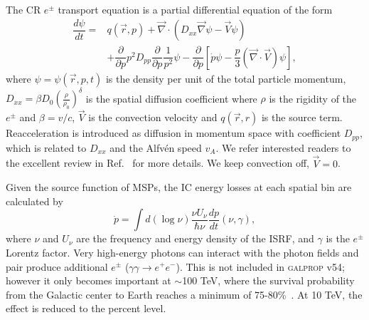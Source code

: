 \documentclass[doublespace,nopageskip]{VTthesis} %
\begin{document}
The CR $e^\pm$ transport equation is a partial differential equation of the form
\begin{align}
  \label{eq:prop_eq}
  \dfrac{d\psi}{dt} = &q(\vec{r},p)+\vec{\nabla}\cdot(D_{xx}\vec{\nabla}\psi-\vec{V}\psi)\nonumber\\
                       &+\dfrac{\partial}{\partial p}p^2D_{pp}\dfrac{\partial}{\partial p}\dfrac{1}{p^2}\psi-\dfrac{\partial}{\partial p}[\dot{p}\psi-\dfrac{p}{3}(\vec{\nabla}\cdot\vec{V})\psi],
\end{align}
where $\psi = \psi(\vec{r},p,t)$ is the density per unit of the total particle momentum, $D_{xx} = \beta D_0 (\frac{\rho}{\rho_0})^\delta$ is the spatial diffusion coefficient where $\rho$ is the rigidity of the $e^\pm$ and $\beta = v/c$, $\vec{V}$ is the convection velocity and $q(\vec{r},r)$ is the source term. Reacceleration is introduced as diffusion in momentum space with coefficient $D_{pp}$, which is related to $D_{xx}$ and the Alfv\'{e}n speed $v_A$. We refer interested readers to the excellent review in Ref.~\cite{Strong:2007nh} for more details. We keep convection off, $\vec{V}=0$.

Given the source function of MSPs, the IC energy losses at each spatial bin are calculated by
\begin{equation}
  \dot{p} = \int d(\log{\nu})\dfrac{\nu U_\nu}{\hbar \nu}\dfrac{dp}{dt}(\nu,\gamma),
\end{equation}
where $\nu$ and $U_\nu$ are the frequency and energy density of the ISRF, and $\gamma$ is the $e^\pm$ Lorentz factor. Very high-energy photons can interact with the photon fields and pair produce additional $e^\pm$ ($\gamma\gamma \to e^+e^-$). This is not included in \textsc{galprop} v54; however it only becomes important at $\sim$100 TeV, where the survival probability from the Galactic center to Earth reaches a minimum of 75-80\%~\cite{Moskalenko:2005ng}. At 10 TeV, the effect is reduced to the percent level.
\end{document}
